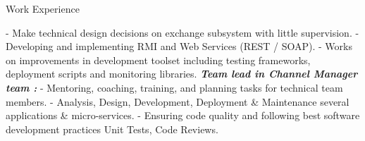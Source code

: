 \begin{jrsection}{Work Experience}
{\begin{jrdescription}
{            - Make technical design decisions on exchange subsystem with little supervision.\linebreak
            - Developing and implementing RMI and Web Services (REST / SOAP).\linebreak
            - Works on improvements in development toolset including testing frameworks,\\
        deployment scripts and monitoring libraries.\linebreak
        \textbf {\textit {Team lead in Channel Manager team :}}\linebreak
            - Mentoring, coaching, training, and planning tasks for technical team members.\linebreak
            - Analysis, Design, Development, Deployment \& Maintenance several applications \& micro-services.\linebreak
            - Ensuring code quality and following best software development practices Unit Tests, Code Reviews.\linebreak
        }
        \end{jrdescription}
    }
\end{jrsection}
